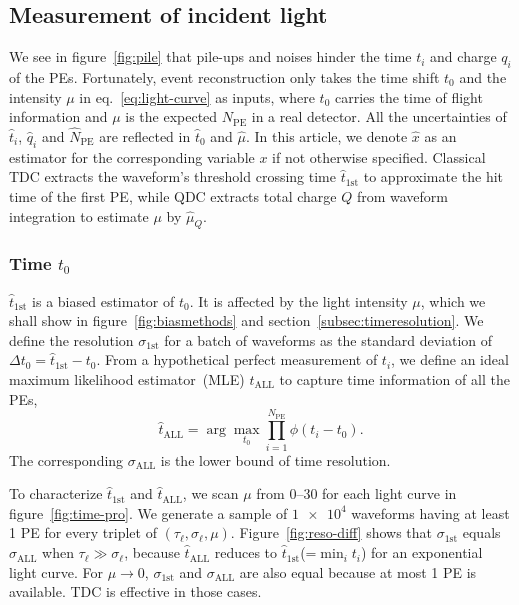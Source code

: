 \subsection{Measurement of incident light}
\label{sec:time}
We see in figure~\ref{fig:pile} that pile-ups and noises hinder the time $t_i$ and charge $q_i$ of the PEs. Fortunately, event reconstruction only takes the time shift $t_0$ and the intensity $\mu$ in eq.~\eqref{eq:light-curve} as inputs, where $t_0$ carries the time of flight information and $\mu$ is the expected $N_\mathrm{PE}$ in a real detector.  All the uncertainties of $\hat{t}_i$, $\hat{q}_i$ and $\hat{N}_\mathrm{PE}$ are reflected in $\hat{t}_0$ and $\hat{\mu}$. In this article, we denote $\hat{x}$ as an estimator for the corresponding variable $x$ if not otherwise specified.  Classical TDC extracts the waveform's threshold crossing time $\hat{t}_\mathrm{1st}$ to approximate the hit time of the first PE, while QDC extracts total charge $Q$ from waveform integration to estimate $\mu$ by $\hat{\mu}_Q$.

\subsubsection{Time $t_0$}
\label{sec:time-shift-t_0}

$\hat{t}_\mathrm{1st}$ is a biased estimator of $t_0$.  It is affected by the light intensity $\mu$, which we shall show in figure~\ref{fig:biasmethods} and section~\ref{subsec:timeresolution}. We define the resolution $\sigma_\mathrm{1st}$ for a batch of waveforms as the standard deviation of $\Delta t_0 = \hat{t}_\mathrm{1st} - t_0$. From a hypothetical perfect measurement of $t_i$, we define an ideal maximum likelihood estimator~(MLE) $\hat{t}_\mathrm{ALL}$ to capture time information of all the PEs,
\begin{equation}
  \label{eq:2}
  \hat{t}_\mathrm{ALL} = \arg\underset{t_0}{\max} \prod_{i=1}^{N_\mathrm{PE}} \phi(t_i-t_0).
\end{equation}
The corresponding $\sigma_\mathrm{ALL}$ is the lower bound of time resolution. 

To characterize $\hat{t}_\mathrm{1st}$ and $\hat{t}_\mathrm{ALL}$, we scan $\mu$ from \numrange{0}{30} for each light curve in figure~\ref{fig:time-pro}. We generate a sample of $\num[retain-unity-mantissa=false]{1e4}$ waveforms having at least 1 PE for every triplet of $(\tau_\ell, \sigma_\ell, \mu)$.  Figure~\ref{fig:reso-diff} shows that $\sigma_{\mathrm{1st}}$ equals $\sigma_{\mathrm{ALL}}$ when $\tau_\ell \gg \sigma_\ell$, because $\hat{t}_\mathrm{ALL}$ reduces to $\hat{t}_\mathrm{1st}$(=$\min_i t_i$) for an exponential light curve. For $\mu \to 0$, $\sigma_{\mathrm{1st}}$ and $\sigma_{\mathrm{ALL}}$ are also equal because at most 1 PE is available.  TDC is effective in those cases.

